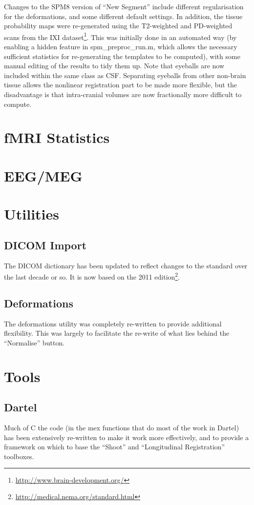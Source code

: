 \documentclass[a4paper,titlepage,openany]{article}
\begin{document}
\begin{multicols}{2}
Changes to the SPM8 version of ``New Segment'' include different regularisation for the deformations, and some different default settings.  In addition, the tissue probability maps were re-generated using the T2-weighted and PD-weighted scans from the IXI dataset\footnote{\url{http://www.brain-development.org/}}.
This was initially done in an automated way (by enabling a hidden feature in spm\_preproc\_run.m, which allows the necessary sufficient statistics for re-generating the templates to be computed), with some manual editing of the results to tidy them up.
Note that eyeballs are now included within the same class as CSF.
Separating eyeballs from other non-brain tissue allows the nonlinear registration part to be made more flexible, but the disadvantage is that intra-cranial volumes are now fractionally more difficult to compute.

\section{fMRI Statistics}

\section{EEG/MEG}

\section{Utilities}

\subsection{DICOM Import}
The DICOM dictionary has been updated to reflect changes to the standard over the last decade or so.
It is now based on the 2011 edition\footnote{\url{http://medical.nema.org/standard.html}}.

\subsection{Deformations}
The deformations utility was completely re-written to provide additional flexibility.
This was largely to facilitate the re-write of what lies behind the ``Normalise'' button.

\section{Tools}

\subsection{Dartel}
Much of C the code (in the mex functions that do most of the work in Dartel) has been extensively re-written to make it work more effectively, and to provide a framework on which to base the ``Shoot'' and ``Longitudinal Registration'' toolboxes.


\end{multicols}
\end{document}
